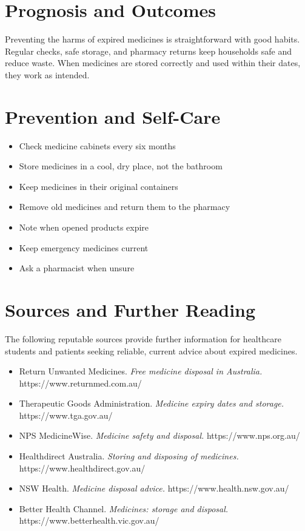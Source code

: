 \section*{Prognosis and Outcomes}
Preventing the harms of expired medicines is straightforward with good habits. Regular checks, safe storage, and pharmacy returns keep households safe and reduce waste. When medicines are stored correctly and used within their dates, they work as intended.

\section*{Prevention and Self-Care}
\begin{itemize}
    \item Check medicine cabinets every six months
    \item Store medicines in a cool, dry place, not the bathroom
    \item Keep medicines in their original containers
    \item Remove old medicines and return them to the pharmacy
    \item Note when opened products expire
    \item Keep emergency medicines current
    \item Ask a pharmacist when unsure
\end{itemize}

\section*{Sources and Further Reading}
The following reputable sources provide further information for healthcare students and patients seeking reliable, current advice about expired medicines.
\begin{itemize}
    \item Return Unwanted Medicines. \textit{Free medicine disposal in Australia.} https://www.returnmed.com.au/
    \item Therapeutic Goods Administration. \textit{Medicine expiry dates and storage.} https://www.tga.gov.au/
    \item NPS MedicineWise. \textit{Medicine safety and disposal.} https://www.nps.org.au/
    \item Healthdirect Australia. \textit{Storing and disposing of medicines.} https://www.healthdirect.gov.au/
    \item NSW Health. \textit{Medicine disposal advice.} https://www.health.nsw.gov.au/
    \item Better Health Channel. \textit{Medicines: storage and disposal.} https://www.betterhealth.vic.gov.au/
\end{itemize}
